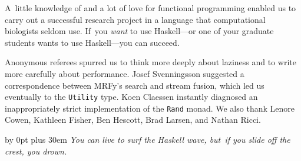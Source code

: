 \documentclass[nonatbib,preprint,blockstyle,times]{sigplanconf}
\newcommand\mrfy{MRFy} %
\begin{document}
A~little knowledge of and a lot of love for functional programming
enabled us to carry out a successful research project in a language
that computational biologists seldom use.
If~you \emph{want} to use Haskell---or one of your graduate students
wants to use Haskell---you can
succeed. 




%  

 

\acks

Anonymous referees spurred us to think
more deeply about laziness and to write more carefully about performance.
Josef Svenningsson suggested a correspondence between \mrfy's search
and stream fusion, which led us eventually to the \texttt{Utility} type.
Koen Claessen instantly diagnosed an inappropriately strict
implementation of the \texttt{Rand} monad.
We also thank Lenore Cowen, Kathleen Fisher, Ben Hescott, Brad
Larsen, and Nathan Ricci. 







\iffinaldraft


\vfill

\begingroup
\parfillskip=0pt
\advance\leftskip by 0pt plus 30em
\emph{You can live to surf the Haskell wave, but~if you slide off the crest, you
drown.}
\par
\endgroup

\fi

\end{document}
